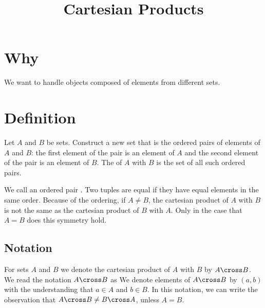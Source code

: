 








\title{Cartesian Products}

\section{Why}

We want to handle objects composed of elements from different sets.

\section{Definition}

Let $A$ and $B$ be sets.
Construct a new set that is the ordered pairs of elements of $A$ and $B$: the first element of the pair is an element of $A$ and the second element of the pair is an element of $B$.
The  of $A$ with $B$ is the set of all such ordered pairs.

We call an ordered pair .
Two tuples are equal if they have equal elements in the same order.
Because of the ordering, if $A \neq B$, the cartesian product of $A$ with $B$ is not the same as the cartesian product of $B$ with $A$.
Only in the case that $A = B$ does this symmetry hold.

\subsection{Notation}
For sets $A$ and $B$ we denote the cartesian product of $A$ with $B$ by $A \cross B$.
We read the notation $A \cross B$ as 
We denote elements of $A \cross B$ by $(a, b)$ with the understanding that $a \in A$ and $b \in B$.
In this notation, we can write the observation that $A \cross B \neq B \cross A$, unless $A = B$.


